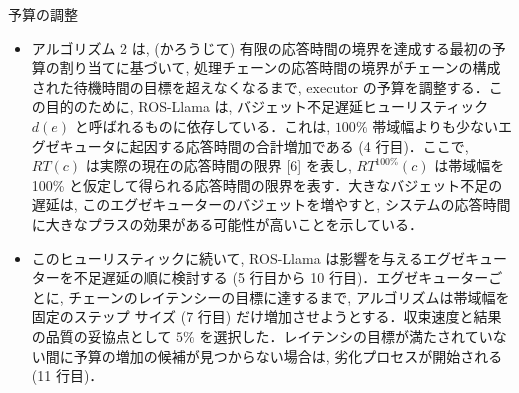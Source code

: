 \begin{frame}{予算の調整}
    \begin{itemize}
        \item アルゴリズム 2 は, (かろうじて) 有限の応答時間の境界を達成する最初の予算の割り当てに基づいて, 処理チェーンの応答時間の境界がチェーンの構成された待機時間の目標を超えなくなるまで, executor の予算を調整する．この目的のために, ROS-Llama は, バジェット不足遅延ヒューリスティック $d(e)$ と呼ばれるものに依存している．これは, $100 \%$ 帯域幅よりも少ないエグゼキュータに起因する応答時間の合計増加である (4 行目)．ここで, $R T(c)$ は実際の現在の応答時間の限界 [6] を表し, $R T^{100 \%}(c)$ は帯域幅を 100\% と仮定して得られる応答時間の限界を表す．大きなバジェット不足の遅延は, このエグゼキューターのバジェットを増やすと, システムの応答時間に大きなプラスの効果がある可能性が高いことを示している．
    \end{itemize}
\end{frame}

\begin{frame}{}
    \begin{itemize}
        \item このヒューリスティックに続いて, ROS-Llama は影響を与えるエグゼキューターを不足遅延の順に検討する (5 行目から 10 行目)．エグゼキューターごとに, チェーンのレイテンシーの目標に達するまで, アルゴリズムは帯域幅を固定のステップ サイズ (7 行目) だけ増加させようとする．収束速度と結果の品質の妥協点として $5 \%$ を選択した．レイテンシの目標が満たされていない間に予算の増加の候補が見つからない場合は, 劣化プロセスが開始される (11 行目)．
    \end{itemize}
\end{frame}
